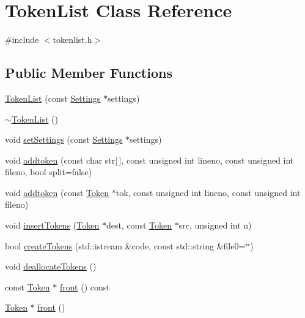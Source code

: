 \hypertarget{class_token_list}{\section{Token\-List Class Reference}
\label{class_token_list}
}


{\ttfamily \#include $<$tokenlist.\-h$>$}

\subsection*{Public Member Functions}
\begin{DoxyCompactItemize}
\item 
\hyperlink{class_token_list_a489dbce709e3620b14c82a82a62de0c7}{Token\-List} (const \hyperlink{class_settings}{Settings} $\ast$settings)
\item 
\hyperlink{class_token_list_a3866ab9d013e6687504768f7ea7334ca}{$\sim$\-Token\-List} ()
\item 
void \hyperlink{class_token_list_a0ccb5c05ef25aec2a0c1b81d1c97cca3}{set\-Settings} (const \hyperlink{class_settings}{Settings} $\ast$settings)
\item 
void \hyperlink{class_token_list_a330fbd871d6a0b353673cd708f16ba29}{addtoken} (const char str\mbox{[}$\,$\mbox{]}, const unsigned int lineno, const unsigned int fileno, bool split=false)
\item 
void \hyperlink{class_token_list_a86fabdd096b2053b6632457248cbe8bd}{addtoken} (const \hyperlink{class_token}{Token} $\ast$tok, const unsigned int lineno, const unsigned int fileno)
\item 
void \hyperlink{class_token_list_ae8ef4705d7af6460bc0cc9468986f5b4}{insert\-Tokens} (\hyperlink{class_token}{Token} $\ast$dest, const \hyperlink{class_token}{Token} $\ast$src, unsigned int n)
\item 
bool \hyperlink{class_token_list_a4a35a3412536b0af435ffc4d7a137438}{create\-Tokens} (std\-::istream \&code, const std\-::string \&file0=\char`\"{}\char`\"{})
\item 
void \hyperlink{class_token_list_a2c449ef37b082f80b75730151abb06f8}{deallocate\-Tokens} ()
\item 
const \hyperlink{class_token}{Token} $\ast$ \hyperlink{class_token_list_ade4cfb70fb5089902dff29ed33a3d40c}{front} () const 
\item 
\hyperlink{class_token}{Token} $\ast$ \hyperlink{class_token_list_a5a9621834b57206164d731c7e64b8018}{front} ()
\item 

\end{DoxyCompactItemize}
